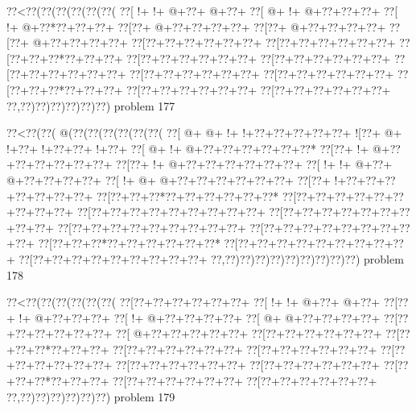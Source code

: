 \vbox{\vbox{\goo
\0??<\0??(\0??(\0??(\0??(\0??(\0??(
\0??[\- !+\- !+\- @+\0??+\- @+\0??+
\0??[\- @+\- !+\- @+\0??+\0??+\0??+
\0??[\- !+\- @+\0??*\0??+\0??+\0??+
\0??[\0??+\- @+\0??+\0??+\0??+\0??+
\0??[\0??+\- @+\0??+\0??+\0??+\0??+
\0??[\0??+\- @+\0??+\0??+\0??+\0??+
\0??[\0??+\0??+\0??+\0??+\0??+\0??+
\0??[\0??+\0??+\0??+\0??+\0??+\0??+
\0??[\0??+\0??+\0??*\0??+\0??+\0??+
\0??[\0??+\0??+\0??+\0??+\0??+\0??+
\0??[\0??+\0??+\0??+\0??+\0??+\0??+
\0??[\0??+\0??+\0??+\0??+\0??+\0??+
\0??[\0??+\0??+\0??+\0??+\0??+\0??+
\0??[\0??+\0??+\0??+\0??+\0??+\0??+
\0??[\0??+\0??+\0??*\0??+\0??+\0??+
\0??[\0??+\0??+\0??+\0??+\0??+\0??+
\0??[\0??+\0??+\0??+\0??+\0??+\0??+
\0??,\0??)\0??)\0??)\0??)\0??)\0??)
}
\hfil problem 177\hfil\break
}

\vbox{\vbox{\goo
\0??<\0??(\0??(\- @(\0??(\0??(\0??(\0??(\0??(\0??(
\0??[\- @+\- @+\- !+\- !+\0??+\0??+\0??+\0??+\0??+
\- ![\0??+\- @+\- !+\0??+\- !+\0??+\0??+\- !+\0??+
\0??[\- @+\- !+\- @+\0??+\0??+\0??+\0??+\0??+\0??*
\0??[\0??+\- !+\- @+\0??+\0??+\0??+\0??+\0??+\0??+
\0??[\0??+\- !+\- @+\0??+\0??+\0??+\0??+\0??+\0??+
\0??[\- !+\- !+\- @+\0??+\- @+\0??+\0??+\0??+\0??+
\0??[\- !+\- @+\- @+\0??+\0??+\0??+\0??+\0??+\0??+
\0??[\0??+\- !+\0??+\0??+\0??+\0??+\0??+\0??+\0??+
\0??[\0??+\0??+\0??*\0??+\0??+\0??+\0??+\0??+\0??*
\0??[\0??+\0??+\0??+\0??+\0??+\0??+\0??+\0??+\0??+
\0??[\0??+\0??+\0??+\0??+\0??+\0??+\0??+\0??+\0??+
\0??[\0??+\0??+\0??+\0??+\0??+\0??+\0??+\0??+\0??+
\0??[\0??+\0??+\0??+\0??+\0??+\0??+\0??+\0??+\0??+
\0??[\0??+\0??+\0??+\0??+\0??+\0??+\0??+\0??+\0??+
\0??[\0??+\0??+\0??*\0??+\0??+\0??+\0??+\0??+\0??*
\0??[\0??+\0??+\0??+\0??+\0??+\0??+\0??+\0??+\0??+
\0??[\0??+\0??+\0??+\0??+\0??+\0??+\0??+\0??+\0??+
\0??,\0??)\0??)\0??)\0??)\0??)\0??)\0??)\0??)\0??)
}
\hfil problem 178\hfil\break
}

\vbox{\vbox{\goo
\0??<\0??(\0??(\0??(\0??(\0??(\0??(
\0??[\0??+\0??+\0??+\0??+\0??+\0??+
\0??[\- !+\- !+\- @+\0??+\- @+\0??+
\0??[\0??+\- !+\- @+\0??+\0??+\0??+
\0??[\- !+\- @+\0??+\0??+\0??+\0??+
\0??[\- @+\- @+\0??+\0??+\0??+\0??+
\0??[\0??+\0??+\0??+\0??+\0??+\0??+
\0??[\- @+\0??+\0??+\0??+\0??+\0??+
\0??[\0??+\0??+\0??+\0??+\0??+\0??+
\0??[\0??+\0??+\0??*\0??+\0??+\0??+
\0??[\0??+\0??+\0??+\0??+\0??+\0??+
\0??[\0??+\0??+\0??+\0??+\0??+\0??+
\0??[\0??+\0??+\0??+\0??+\0??+\0??+
\0??[\0??+\0??+\0??+\0??+\0??+\0??+
\0??[\0??+\0??+\0??+\0??+\0??+\0??+
\0??[\0??+\0??+\0??*\0??+\0??+\0??+
\0??[\0??+\0??+\0??+\0??+\0??+\0??+
\0??[\0??+\0??+\0??+\0??+\0??+\0??+
\0??,\0??)\0??)\0??)\0??)\0??)\0??)
}
\hfil problem 179\hfil\break
}

